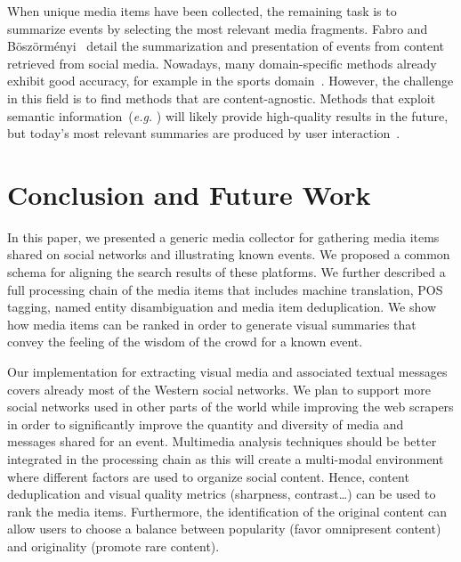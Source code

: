 \documentclass{acm_proc_article-sp}
\let\oldemph\emph
\renewcommand{\emph}[1]{\oldemph{\fontsize{9}{9}\selectfont #1}}
\begin{document}
When unique media items have been collected, the remaining task is to summarize events by selecting the most relevant media fragments. Fabro and B\"osz\"orm\'enyi~\cite{Fabro:MMM12} detail the summarization and presentation of events from content retrieved from social media. Nowadays, many domain-specific methods already exhibit good accuracy, for example in the sports domain~\cite{Li1,Li2}. However, the challenge in this field is to find methods that are content-agnostic. Methods that exploit semantic information~(\emph{e.g.} \cite{Chen}) will likely provide high-quality results in the future, but today's most relevant summaries are produced by user interaction~\cite{Olsen}.


\section{Conclusion and Future Work}                                        \label{sec:conclusion}
In this paper, we presented a generic media collector for gathering media items shared on social networks and illustrating known events. We proposed a common schema for aligning the search results of these platforms. We further described a full processing chain of the media items that includes machine translation, POS tagging, named entity disambiguation and media item deduplication. We show how media items can be ranked in order to generate visual summaries that convey the feeling of the wisdom of the crowd for a known event.

Our implementation for extracting visual media and associated textual messages covers already most of the Western social networks. We plan to support more social networks used in other parts of the world while improving the web scrapers in order to significantly improve the quantity and diversity of media and messages shared for an event. Multimedia analysis techniques should be better integrated in the processing chain as this will create a multi-modal environment where different factors are used to organize social content. Hence, content deduplication and visual quality metrics (sharpness, contrast\ldots) can be used to rank the media items. Furthermore, the identification of the original content can allow users to choose a balance between popularity (favor omnipresent content) and originality (promote rare content).
\end{document}
